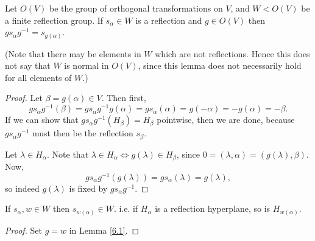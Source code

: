 \begin{lemma} \label{6.1}
Let $O(V)$ be the group of orthogonal transformations on $V$, and
$W < O(V)$ be a finite reflection group. If $s_\alpha \in W$ is a reflection
and $g \in O(V)$ then $g s_\alpha g^{-1} = s_{g(\alpha)}$.
\end{lemma}

(Note that there may be elements in $W$ which are not reflections. Hence this
does not say that $W$ is normal in $O(V)$, since this lemma does not necessarily
hold for all elements of $W$.)

\begin{proof}
Let $\beta = g(\alpha) \in V$. Then first,
\[
g s_\alpha g^{-1}(\beta) = g s_\alpha g^{-1} g(\alpha)
= g s_\alpha(\alpha) = g(-\alpha) = -g(\alpha) = -\beta.
\]
If we can show that $g s_\alpha g^{-1} (H_\beta) = H_\beta$ pointwise, then we
are done, because $g s_\alpha g^{-1}$ must then be the reflection $s_\beta$.

Let $\lambda \in H_\alpha$. Note that $\lambda \in H_\alpha \iff
g(\lambda) \in H_\beta$, since $0 = (\lambda, \alpha) = (g(\lambda), \beta)$.
Now,
\[
    g s_\alpha g^{-1} (g(\lambda)) = g s_\alpha(\lambda) = g(\lambda),
\]
so indeed $g(\lambda)$ is fixed by $g s_\alpha g^{-1}$.
\end{proof}


\begin{corollary} \label{6.2}
If $s_\alpha, w \in W$ then $s_{w(\alpha)} \in W$.
i.e. if $H_\alpha$ is a reflection hyperplane, so is $H_{w(\alpha)}$.
\end{corollary}
\begin{proof}
Set $g = w$ in Lemma \ref{6.1}.
\end{proof}

